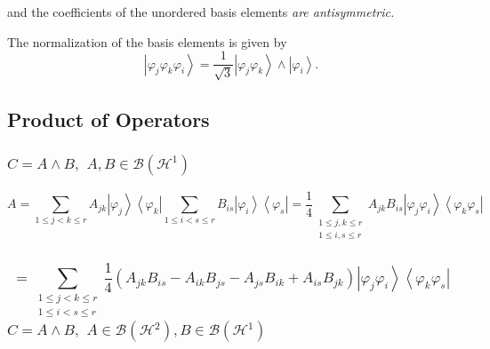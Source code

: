 \documentclass[aps,preprint]{revtex4}%
\begin{document}
and the coefficients of the unordered basis elements \emph{are antisymmetric.
}

The normalization of the basis elements is given by
\begin{equation}
\left\vert \varphi_{j}\varphi_{k}\varphi_{i}\right\rangle =\frac{1}{\sqrt{3}%
}\left\vert \varphi_{j}\varphi_{k}\right\rangle \wedge\left\vert \varphi
_{i}\right\rangle .
\end{equation}


\subsection{Product of Operators}

\subsubsection{$C=A\wedge B,$ $A,B\in\mathcal{B}\left(  \mathcal{H}%
^{1}\right)  $}%

\begin{equation}
A=\sum_{1\leq j<k\leq r}A_{jk}\left\vert \varphi_{j}\right\rangle \left\langle
\varphi_{k}\right\vert \sum_{1\leq i<s\leq r}B_{is}\left\vert \varphi
_{i}\right\rangle \left\langle \varphi_{s}\right\vert =\frac{1}{4}%
\sum_{\substack{1\leq j,k\leq r\\1\leq i,s\leq r}}A_{jk}B_{is}\left\vert
\varphi_{j}\varphi_{i}\right\rangle \left\langle \varphi_{k}\varphi
_{s}\right\vert
\end{equation}


\subsubsection{%
\begin{equation}
=\sum_{\substack{1\leq j<k\leq r\\1\leq i<s\leq r}}\frac{1}{4}\left(
A_{jk}B_{is}-A_{ik}B_{js}-A_{js}B_{ik}+A_{is}B_{jk}\right)  \left\vert
\varphi_{j}\varphi_{i}\right\rangle \left\langle \varphi_{k}\varphi
_{s}\right\vert
\end{equation}
$C=A\wedge B,$ $A\in\mathcal{B}\left(  \mathcal{H}^{2}\right)  ,B\in
\mathcal{B}\left(  \mathcal{H}^{1}\right)  $}%
\end{document}
